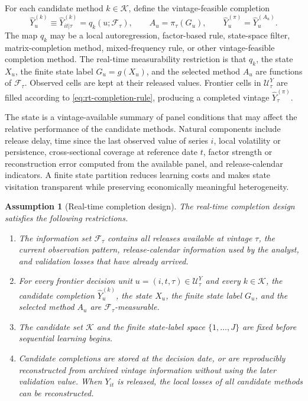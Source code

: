 \documentclass[a4paper, 12pt]{article}
\theoremstyle{plain}
\newtheorem{assumption}{Assumption}
\theoremstyle{remark}
\newcommand{\Kcal}{\mathcal{K}}
\newcommand{\Ucal}{\mathcal{U}}
\newcommand{\Fcal}{\mathcal{F}}
\newcommand{\1}{\mathbf{1}}
\begin{document}
For each candidate method \(k\in\Kcal\), define the vintage-feasible completion
\begin{equation}
\label{eq:rt-completion-rule}
    \widehat Y^{(k)}_u
    \equiv
    \widehat Y^{(k)}_{it|\tau}
    =q_k(u;\Fcal_\tau),
    \qquad
    A_u=\pi_\tau(G_u),
    \qquad
    \widehat Y^{(\pi)}_u=\widehat Y^{(A_u)}_u .
\end{equation}
The map \(q_k\) may be a local autoregression, factor-based rule, state-space filter, matrix-completion method, mixed-frequency rule, or other vintage-feasible completion method. The real-time measurability restriction is that \(q_k\), the state \(X_u\), the finite state label \(G_u=g(X_u)\), and the selected method \(A_u\) are functions of \(\Fcal_\tau\). Observed cells are kept at their released values. Frontier cells in \(\Ucal^Y_\tau\) are filled according to \eqref{eq:rt-completion-rule}, producing a completed vintage \(\widehat Y^{(\pi)}_\tau\).

The state is a vintage-available summary of panel conditions that may affect the relative performance of the candidate methods. Natural components include release delay, time since the last observed value of series \(i\), local volatility or persistence, cross-sectional coverage at reference date \(t\), factor strength or reconstruction error computed from the available panel, and release-calendar indicators. A finite state partition reduces learning costs and makes state visitation transparent while preserving economically meaningful heterogeneity.

\begin{assumption}[Real-time completion design]
\label{ass:rt-environment}
The real-time completion design satisfies the following restrictions.
\begin{enumerate}[label=(\alph*), leftmargin=*]
    \item The information set \(\Fcal_\tau\) contains all releases available at vintage \(\tau\), the current observation pattern, release-calendar information used by the analyst, and validation losses that have already arrived.
    \item For every frontier decision unit \(u=(i,t,\tau)\in\Ucal^Y_\tau\) and every \(k\in\Kcal\), the candidate completion \(\widehat Y^{(k)}_u\), the state \(X_u\), the finite state label \(G_u\), and the selected method \(A_u\) are \(\Fcal_\tau\)-measurable.
    \item The candidate set \(\Kcal\) and the finite state-label space \(\{1,\ldots,J\}\) are fixed before sequential learning begins.
    \item Candidate completions are stored at the decision date, or are reproducibly reconstructed from archived vintage information without using the later validation value. When \(Y_{it}\) is released, the local losses of all candidate methods can be reconstructed.
\end{enumerate}
\end{assumption}
\end{document}
